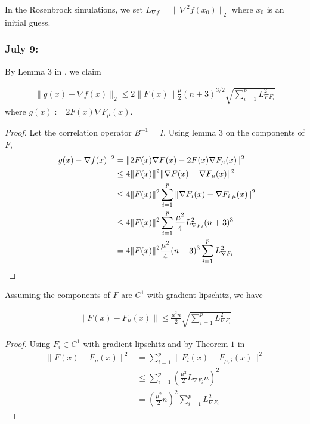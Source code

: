 \documentclass{article}
\begin{document}
In the Rosenbrock simulations, we set $L_{\nabla f} = \|\nabla^2 f(x_0)\|_2$ where $x_0$ is an initial guess. 



\subsubsection{July 9:}  

By Lemma $3$ in \cite{Nesterov2015}, we claim 

\begin{align}
\|g(x) - \nabla f(x)\|_2 \leq 2\|F(x)\| \frac{\mu}{2}(n+3)^{3/2}\sqrt{\sum_{i=1}^pL_{\nabla F_i}^2}
\end{align}
where $g(x) := 2F(x)\nabla F_{\mu}(x)$. 
\begin{proof}
Let the correlation operator $B^{-1} = I$. Using lemma $3$ on the components of $F$,
\begin{align}
\|g(x) - \nabla f(x)\|^2 & = \| 2F(x)\nabla F(x) - 2F(x)\nabla F_{\mu}(x)\|^2 \notag \\ & \leq  4 \|F(x)\|^2 \| \nabla F(x) - \nabla F_{\mu}(x)\|^2 \notag \\ & \leq  4\|F(x)\|^2 \sum_{i=1}^p \|\nabla F_i(x) - \nabla F_{i,\mu}(x)\|^2  \notag \\ & \leq 4\|F(x)\|^2 \sum_{i=1}^p \frac{\mu^2}{4}L_{\nabla F_i}^2 (n+3)^3 \notag \\ & = 4 \|F(x) \|^2 \frac{\mu^2}{4}(n+3)^3 \sum_{i=1}^p L_{\nabla F_i}^2
\end{align}
\end{proof}

Assuming the components of $F$ are $C^1$ with gradient lipschitz, we have 

\begin{align}
\|F(x) - F_{\mu}(x)\| \leq \frac{\mu^2n}{2}\sqrt{\sum_{i=1}^p L_{\nabla F_i}^2}
\end{align}

\begin{proof}

Using $F_i \in C^1$ with gradient lipschitz and by Theorem $1$ in \cite{Nesterov2015}
\begin{align*}
\|F(x) - F_{\mu}(x)\|^2 & = \sum_{i=1}^p\|F_i(x) - F_{\mu,i}(x)\|^2 \\ & \leq \sum_{i=1}^p\left(\frac{\mu^2}{2}L_{\nabla F_i}n\right)^2 \\ & = \left(\frac{\mu^2}{2}n\right)^2 \sum_{i=1}^p L_{\nabla F_i}^2 
\end{align*}
\end{proof}
\end{document}

